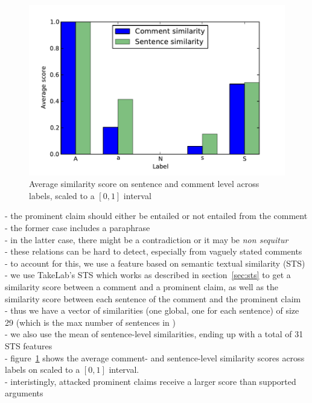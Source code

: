 \begin{figure}
\includegraphics{similarity.pdf}
\caption{Average similarity score  on sentence and comment level across
labels, scaled to a $[0,1]$ interval}
\label{fig:sts_comarg}
\end{figure}

- the prominent claim should either be entailed or not entailed from the comment \\
- the former case includes a paraphrase \\
- in the latter case, there might be a contradiction or it may be \textit{non sequitur} \\
- these relations can be hard to detect, especially from vaguely stated comments \\
- to account for this, we use a feature based on semantic textual similarity (STS) \\
- we use TakeLab's STS \citep{vsaric2012takelab} which works as described in
section~\ref{sec:sts} to get a similarity score between 
a comment and a prominent claim, as well as the similarity score between 
each sentence of the comment and the prominent claim \\
- thus we have a vector of similarities (one global, one for each sentence) of size
29 (which is the max number of sentences in \ComArg )  \\
- we also use the mean of sentence-level similarities, ending up with a total of 31 STS features \\
- figure~\ref{fig:sts_comarg} shows the average comment- and sentence-level similarity scores
across labels on \ComArg scaled to a $[0, 1]$ interval. \\
- interistingly, attacked prominent claims receive a larger score than supported arguments \\

